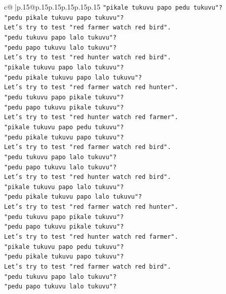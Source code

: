 \documentclass{article}
\begin{document}
{\begin{supertabular}{c@{$\;$}|p{.15\linewidth}@{}p{.15\linewidth}p{.15\linewidth}p{.15\linewidth}p{.15\linewidth}p{.15\linewidth}}
{{{\texttt{"pikale tukuvu papo pedu tukuvu"?} \\
\texttt{"pedu pikale tukuvu papo tukuvu"?} \\
\texttt{Let's try to test "red farmer watch red bird".} \\
\texttt{"pedu tukuvu papo lalo tukuvu"?} \\
\texttt{"pedu papo tukuvu lalo tukuvu"?} \\
\texttt{Let's try to test "red hunter watch red bird".} \\
\texttt{"pikale tukuvu papo lalo tukuvu"?} \\
\texttt{"pedu pikale tukuvu papo lalo tukuvu"?} \\
\texttt{Let's try to test "red farmer watch red hunter".} \\
\texttt{"pedu tukuvu papo pikale tukuvu"?} \\
\texttt{"pedu papo tukuvu pikale tukuvu"?} \\
\texttt{Let's try to test "red hunter watch red farmer".} \\
\texttt{"pikale tukuvu papo pedu tukuvu"?} \\
\texttt{"pedu pikale tukuvu papo tukuvu"?} \\
\texttt{Let's try to test "red farmer watch red bird".} \\
\texttt{"pedu tukuvu papo lalo tukuvu"?} \\
\texttt{"pedu papo tukuvu lalo tukuvu"?} \\
\texttt{Let's try to test "red hunter watch red bird".} \\
\texttt{"pikale tukuvu papo lalo tukuvu"?} \\
\texttt{"pedu pikale tukuvu papo lalo tukuvu"?} \\
\texttt{Let's try to test "red farmer watch red hunter".} \\
\texttt{"pedu tukuvu papo pikale tukuvu"?} \\
\texttt{"pedu papo tukuvu pikale tukuvu"?} \\
\texttt{Let's try to test "red hunter watch red farmer".} \\
\texttt{"pikale tukuvu papo pedu tukuvu"?} \\
\texttt{"pedu pikale tukuvu papo tukuvu"?} \\
\texttt{Let's try to test "red farmer watch red bird".} \\
\texttt{"pedu tukuvu papo lalo tukuvu"?} \\
\texttt{"pedu papo tukuvu lalo tukuvu"?} \\
}}}
\end{supertabular}}
\end{document}
